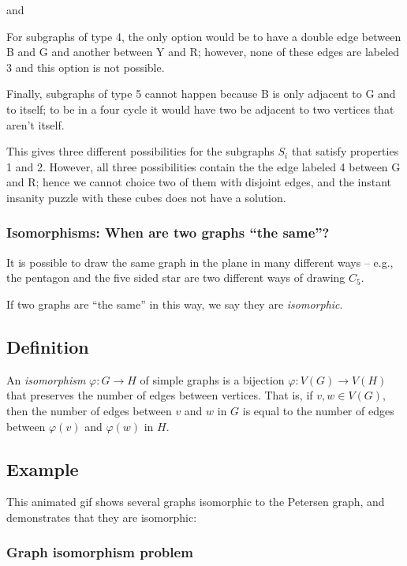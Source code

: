 \documentclass[]{article}
\begin{document}
and

For subgraphs of type 4, the only option would be to have a double edge
between B and G and another between Y and R; however, none of these
edges are labeled 3 and this option is not possible.

Finally, subgraphs of type 5 cannot happen because B is only adjacent to
G and to itself; to be in a four cycle it would have two be adjacent to
two vertices that aren't itself.

This gives three different possibilities for the subgraphs \(S_i\) that
satisfy properties 1 and 2. However, all three possibilities contain the
the edge labeled 4 between G and R; hence we cannot choice two of them
with disjoint edges, and the instant insanity puzzle with these cubes
does not have a solution.

\subsubsection{\texorpdfstring{Isomorphisms: When are two graphs ``the
same''?}{Isomorphisms: When are two graphs the same?}}\label{isomorphisms-when-are-two-graphs-the-same}

It is possible to draw the same graph in the plane in many different
ways -- e.g., the pentagon and the five sided star are two different
ways of drawing \(C_5\).

If two graphs are ``the same'' in this way, we say they are
\emph{isomorphic}.

\subsection{Definition}\label{definition}

An \emph{isomorphism} \(\varphi:G\to H\) of simple graphs is a bijection
\(\varphi:V(G)\to V(H)\) that preserves the number of edges between
vertices. That is, if \(v,w\in V(G)\), then the number of edges between
\(v\) and \(w\) in \(G\) is equal to the number of edges between
\(\varphi(v)\) and \(\varphi(w)\) in \(H\).

\subsection{Example}\label{example}

This animated gif shows several graphs isomorphic to the Petersen graph,
and demonstrates that they are isomorphic:

\subsubsection{Graph isomorphism problem}\label{graph-isomorphism-problem}
\end{document}
